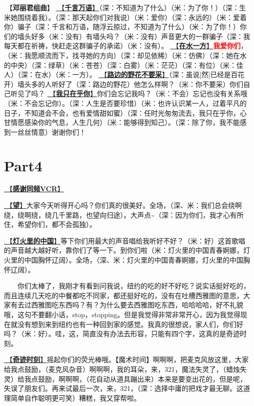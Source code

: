 \documentclass[]{ctexbook}
\begin{document}
🎵【\textbf{邓丽君组曲}】
\hyperref[thousands-of-words]{🎵【\textbf{千言万语}】}（深：不知道为了什么）（米：为了你！）（深：生米她围绕着我）。（深：那天起你们对我说）（米：爱你）（深：永远的）（米：爱着你）骗子（深：千言和万语，随浮云掠过，不知道为了什么）（米：为了你！）你们的墙头好多（米：没有）有墙头吗？（米：没有）声音更大的一群骗子（深：我每天都在祈祷，快赶走这群骗子的承诺）（米：没有）。
\hyperref[on-the-water-side]{🎵【\textbf{在水一方}】}\textbf{\textcolor{red}{我爱你们}}，（米：我愿顺流而下，找寻她的方向）（深：却见依稀）（米：仿佛）（深：她在水的中央）（深：绿草）（米：苍苍）（深：白雾）（米：茫茫）（深：有位）（米：佳人）（深：在水）（米：一方）。
\hyperref[only-with-me]{🎵【\textbf{路边的野花不要采}】}（深：虽说{[}然{]}已经是百花开）墙头多的人听好了（深：路边的野花）他怎么样啊？（米：你不要采）你们自己听见了吗？
\hyperref[only-you]{🎵【\textbf{我只在乎你}】}你们会忘记我吗？（米：不会）忘记也没有关系哦（米：不会忘记你）。（深：人生是否要珍惜）（米：也许认识某一人，过着平凡的日子，不知道会不会，也有爱情甜如蜜）（深：任时光匆匆流去，我只在乎你，心甘情愿感染你的气息，人生几何）（米：能够得到知己）。（深：除了你，我不能感到一丝丝情意）谢谢你们！

\section{Part4}\label{NewYork-20250309-part4}

\hyperref[thank-you-vcr]{🎥【\textbf{感谢同频VCR}】}

\hyperref[hope]{🎵【\textbf{望}】}大家今天听得开心吗？你们真的很美好。全场，（深、米：我们总会绕啊绕，绕啊绕，绕几千里路，也望向归途）。大声点\textasciitilde（深：因为你们，我才心有所住，希望你们，都不会孤独）。

\hyperref[China-in-the-light]{🎵【\textbf{灯火里的中国}】}等下你们用最大的声音唱给我听好不好？（米：好）这首歌唱的声音越大越好听，靠你们了等一下。到你们啦（米：灯火里的中国青春婀娜，灯火里的中国胸怀辽阔）。全场，（深、米：灯火里的中国青春婀娜，灯火里的中国胸怀辽阔）。

  你们太棒了，我刚才有看到问我说，纽约的吃的好不好吃？说实话挺好吃的，而且连续几天吃的中餐都吃不同家，都还挺好吃的，没有在吐槽西雅图的意思，大家有去过西雅图吃东西吗？有？为什么要去西雅图吃东西，哈哈哈哈，好不礼貌哦，这句不要翻小话，stop，stopping。但是我觉得非常非常开心，因为我觉得现在就没有想到来到纽约也有一种回到家的感觉。我真的很想说，家人们，你们好吗？（米：好）。哇，这，简直没有办法去形容，只能有四个字，这真的是奇迹时刻。

\hyperref[magic-moment]{🎵【\textbf{奇迹时刻}】}摇起你们的荧光棒哦。【魔术时间】啊啊啊，把麦克风放这里，大家给我点鼓励，（麦克风杂音）啊啊啊，我的耳朵，来，321，魔法失灵了，（蜡烛失灵）给我点鼓励，啊啊啊，（花自动从道具蹦出来）本来是要变出花的，但是呢，失误了朋友们。再来试最后一次，来，321，（深：选择中庸的把戏才最无聊。这道理简单自作聪明更可笑）糟糕，我又穿帮啦。
\end{document}
